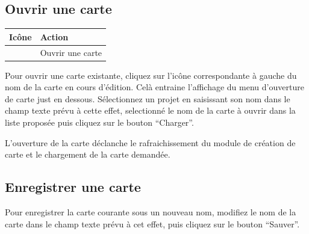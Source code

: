 \documentclass[letterpaper,10pt,french]{sphinxmanual}
\begin{document}
\subsection{Ouvrir une carte}
\label{maps/layerstree:ouvrir-une-carte}
\begin{tabulary}{\linewidth}{|L|L|}
\hline

\textbf{Icône}
 & 
\textbf{Action}
\\
\hline
{}
 & 
Ouvrir une carte
\\
\hline\end{tabulary}


Pour ouvrir une carte existante, cliquez sur l'icône correspondante à
gauche du nom de la carte en cours d'édition. Celà entraine
l'affichage du menu d'ouverture de carte just en dessous. Sélectionnez
un projet en saisissant son nom dans le champ texte prévu à cette
effet, selectionné le nom de la carte à ouvrir dans la liste proposée
puis cliquez sur le bouton ``Charger''.


L'ouverture de la carte déclanche le rafraichissement du module de
création de carte et le chargement de la carte demandée.


\subsection{Enregistrer une carte}
\label{maps/layerstree:enregistrer-une-carte}
Pour enregistrer la carte courante sous un nouveau nom, modifiez le
nom de la carte dans le champ texte prévu à cet effet, puis cliquez
sur le bouton ``Sauver''.
\end{document}
